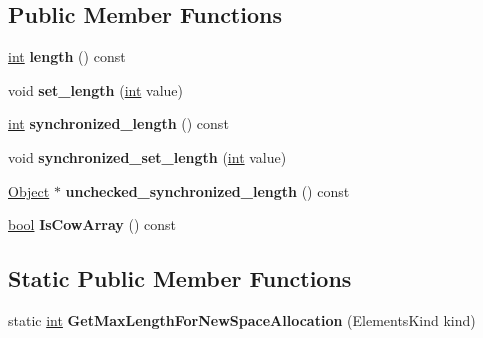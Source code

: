 \subsection*{Public Member Functions}
\begin{DoxyCompactItemize}
\item 
\mbox{\label{classv8_1_1internal_1_1FixedArrayBase_a5936cb5b29660b49b39b80c832c4445b}} 
\mbox{\hyperlink{classint}{int}} {\bfseries length} () const
\item 
\mbox{\label{classv8_1_1internal_1_1FixedArrayBase_a67b8eea4413f1651bfe1a8b4c74f53d1}} 
void {\bfseries set\+\_\+length} (\mbox{\hyperlink{classint}{int}} value)
\item 
\mbox{\label{classv8_1_1internal_1_1FixedArrayBase_a85cb7a5837fa68b8f3cb2ea650ddb3b9}} 
\mbox{\hyperlink{classint}{int}} {\bfseries synchronized\+\_\+length} () const
\item 
\mbox{\label{classv8_1_1internal_1_1FixedArrayBase_ac4a59d797d382670634fa9b046eba1cc}} 
void {\bfseries synchronized\+\_\+set\+\_\+length} (\mbox{\hyperlink{classint}{int}} value)
\item 
\mbox{\label{classv8_1_1internal_1_1FixedArrayBase_aa987461ce8db2b649f28c447e886bc5e}} 
\mbox{\hyperlink{classv8_1_1internal_1_1Object}{Object}} $\ast$ {\bfseries unchecked\+\_\+synchronized\+\_\+length} () const
\item 
\mbox{\label{classv8_1_1internal_1_1FixedArrayBase_a34e26909b87fe2a8a575c0af0637ac54}} 
\mbox{\hyperlink{classbool}{bool}} {\bfseries Is\+Cow\+Array} () const
\end{DoxyCompactItemize}
\subsection*{Static Public Member Functions}
\begin{DoxyCompactItemize}
\item 
\mbox{\label{classv8_1_1internal_1_1FixedArrayBase_a5168f2dad5b4bde686071eb39f82eb3f}} 
static \mbox{\hyperlink{classint}{int}} {\bfseries Get\+Max\+Length\+For\+New\+Space\+Allocation} (Elements\+Kind kind)
\end{DoxyCompactItemize}
